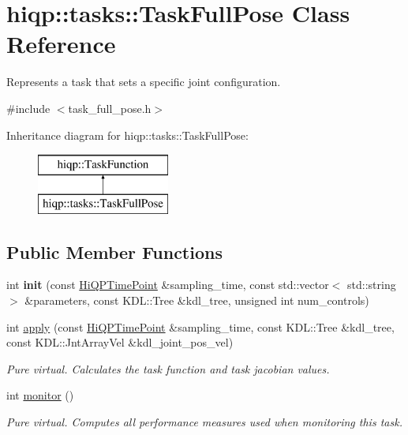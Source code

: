 \hypertarget{classhiqp_1_1tasks_1_1TaskFullPose}{\section{hiqp\-:\-:tasks\-:\-:Task\-Full\-Pose Class Reference}
\label{classhiqp_1_1tasks_1_1TaskFullPose}
}


Represents a task that sets a specific joint configuration.  




{\ttfamily \#include $<$task\-\_\-full\-\_\-pose.\-h$>$}

Inheritance diagram for hiqp\-:\-:tasks\-:\-:Task\-Full\-Pose\-:\begin{figure}[H]
\begin{center}
\leavevmode
\includegraphics[height=2.000000cm]{classhiqp_1_1tasks_1_1TaskFullPose}
\end{center}
\end{figure}
\subsection*{Public Member Functions}
\begin{DoxyCompactItemize}
\item 
\hypertarget{classhiqp_1_1tasks_1_1TaskFullPose_aa15ec40a44969406e712c906da17a174}{int {\bfseries init} (const \hyperlink{classhiqp_1_1HiQPTimePoint}{Hi\-Q\-P\-Time\-Point} \&sampling\-\_\-time, const std\-::vector$<$ std\-::string $>$ \&parameters, const K\-D\-L\-::\-Tree \&kdl\-\_\-tree, unsigned int num\-\_\-controls)}\label{classhiqp_1_1tasks_1_1TaskFullPose_aa15ec40a44969406e712c906da17a174}

\item 
int \hyperlink{classhiqp_1_1tasks_1_1TaskFullPose_aa3f9600219741a8bb7ffcb15bba19c70}{apply} (const \hyperlink{classhiqp_1_1HiQPTimePoint}{Hi\-Q\-P\-Time\-Point} \&sampling\-\_\-time, const K\-D\-L\-::\-Tree \&kdl\-\_\-tree, const K\-D\-L\-::\-Jnt\-Array\-Vel \&kdl\-\_\-joint\-\_\-pos\-\_\-vel)
\begin{DoxyCompactList}\small\item\em {\itshape Pure virtual}. Calculates the task function and task jacobian values. \end{DoxyCompactList}\item 
int \hyperlink{classhiqp_1_1tasks_1_1TaskFullPose_a1280f9a08af7083c28fc31cf66a61f55}{monitor} ()
\begin{DoxyCompactList}\small\item\em {\itshape Pure virtual}. Computes all performance measures used when monitoring this task. \end{DoxyCompactList}\end{DoxyCompactItemize}
